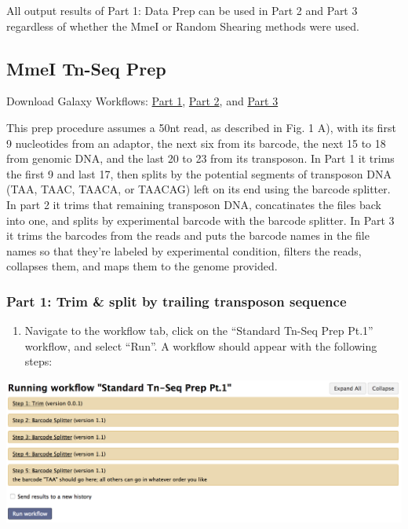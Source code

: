 \documentclass[11pt,]{article}
\providecommand{\tightlist}{%
  \setlength{\itemsep}{0pt}\setlength{\parskip}{0pt}}
\begin{document}
All output results of Part 1: Data Prep can be used in Part 2 and Part 3
regardless of whether the MmeI or Random Shearing methods were used.

\subsection{MmeI Tn-Seq Prep}\label{mmei-tn-seq-prep}

Download Galaxy Workflows:
\href{https://raw.githubusercontent.com/vanOpijnenLab/magenta-p2/blob/master/workflows/Galaxy-Workflow-MmeI_Tn-Seq_Prep_Pt.1.ga}{Part
1},
\href{https://raw.githubusercontent.com/vanOpijnenLab/magenta-p2/blob/master/workflows/Galaxy-Workflow-MmeI_Tn-Seq_Prep_Pt.2.ga}{Part
2}, and
\href{https://raw.githubusercontent.com/vanOpijnenLab/magenta-p2/blob/master/workflows/Galaxy-Workflow-MmeI_Tn-Seq_Prep_Pt.3.ga}{Part
3}

This prep procedure assumes a 50nt read, as described in Fig. 1 A), with
its first 9 nucleotides from an adaptor, the next six from its barcode,
the next 15 to 18 from genomic DNA, and the last 20 to 23 from its
transposon. In Part 1 it trims the first 9 and last 17, then splits by
the potential segments of transposon DNA (TAA, TAAC, TAACA, or TAACAG)
left on its end using the barcode splitter. In part 2 it trims that
remaining transposon DNA, concatinates the files back into one, and
splits by experimental barcode with the barcode splitter. In Part 3 it
trims the barcodes from the reads and puts the barcode names in the file
names so that they're labeled by experimental condition, filters the
reads, collapses them, and maps them to the genome provided.

\subsubsection{Part 1: Trim \& split by trailing transposon
sequence}\label{part-1-trim-split-by-trailing-transposon-sequence}

\begin{enumerate}
\def\labelenumi{\arabic{enumi}.}
\tightlist
\item
  Navigate to the workflow tab, click on the ``Standard Tn-Seq Prep
  Pt.1'' workflow, and select ``Run''. A workflow should appear with the
  following steps:
\end{enumerate}

\centerline{\includegraphics[width=0.8\linewidth]{figs/StandPrep1.png}}
\end{document}
